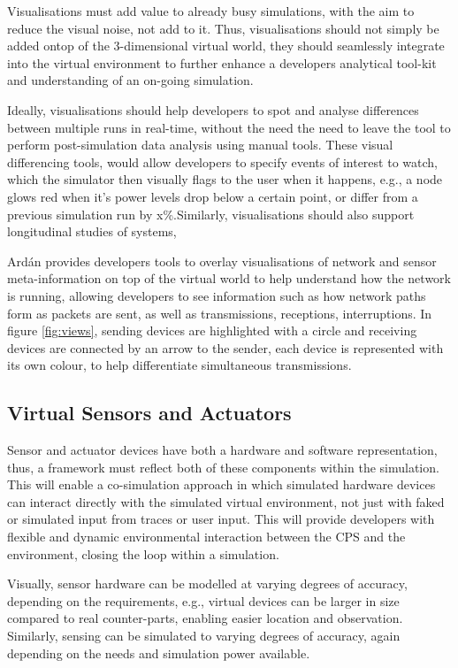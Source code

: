Visualisations must add value to already busy simulations, with the aim to reduce the visual noise, not add to it. Thus, visualisations should not simply be added ontop of the 3-dimensional virtual world, they should seamlessly integrate into the virtual environment to further enhance a developers analytical tool-kit and understanding of an on-going simulation. 

Ideally, visualisations should help developers to spot and analyse differences between multiple runs in real-time, without the need the need to leave the tool to perform post-simulation data analysis using manual tools. These visual differencing tools, would allow developers to specify events of interest to watch, which the simulator then visually flags to the user when it happens, e.g., a node glows red when it's power levels drop below a certain point, or differ from a previous simulation run by x\%.Similarly, visualisations should also support longitudinal studies of systems, 


Ard\'{a}n provides developers tools to overlay visualisations of network and sensor meta-information on top of the virtual world to help understand how the network is running, allowing developers to see information such as how network paths form as packets are sent, as well as transmissions, receptions, interruptions. In figure \ref{fig:views}, sending devices are highlighted with a circle and receiving devices are connected by an arrow to the sender, each device is represented with its own colour, to help differentiate simultaneous transmissions.

\subsection{Virtual Sensors and Actuators}
\label{sub:requirements_Virtual Sensors and Actuators}
Sensor and actuator devices have both a hardware and software representation, thus, a framework must reflect both of these components within the simulation. This will enable a co-simulation approach in which simulated hardware devices can interact directly with the simulated virtual environment, not just with faked or simulated input from traces or user input. This will provide developers with flexible and dynamic environmental interaction between the CPS and the environment, closing the loop within a simulation. 

Visually, sensor hardware can be modelled at varying degrees of accuracy, depending on the requirements, e.g., virtual devices can be larger in size compared to real counter-parts, enabling easier location and observation. Similarly, sensing can be simulated to varying degrees of accuracy, again depending on the needs and simulation power available. 

